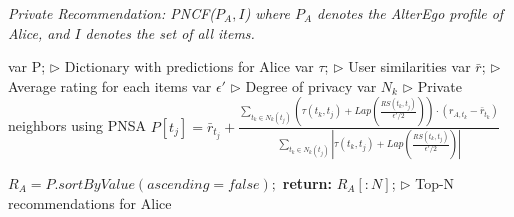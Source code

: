 \begin{algorithm}[!htb]
\caption{\small\itshape Private Recommendation: PNCF($P_A, I$) \quad \quad where $P_A$ denotes the AlterEgo profile of Alice, and $I$ denotes the set of all items.}
\label{PrivRecoAlgo}
\begin{algorithmic}[1]
\State var P; \hfill $\rhd$ Dictionary with predictions for Alice
\State var $\tau$; \hfill $\rhd$ User similarities
\State var $\bar{r}$; \hfill $\rhd$ Average rating for each items
\State var $\epsilon'$ \hfill $\rhd$ Degree of privacy
\State var $N_k$ \hfill $\rhd$ Private neighbors using PNSA
\State \hspace{-5mm}$P[t_j]=\bar{r}_{t_j} +\frac{\sum_{t_k \in N_k(t_j)} (\tau(t_k, t_j) + Lap(\frac{RS(t_k, t_j)}{\epsilon' / 2})) \cdot (r_{A,t_k}- \bar{r}_{t_k})}{\sum_{t_k \in N_k(t_j)} |\tau(t_k, t_j) + Lap(\frac{RS(t_k, t_j)}{\epsilon' / 2})| }$
\EndFor
\EndFor

\State $R_{A}=P.sortByValue(ascending=false);$
\State \textbf{return:} $R_{A}[:N]$; \hfill $\rhd$ Top-N recommendations for Alice
\end{algorithmic}
\end{algorithm}

